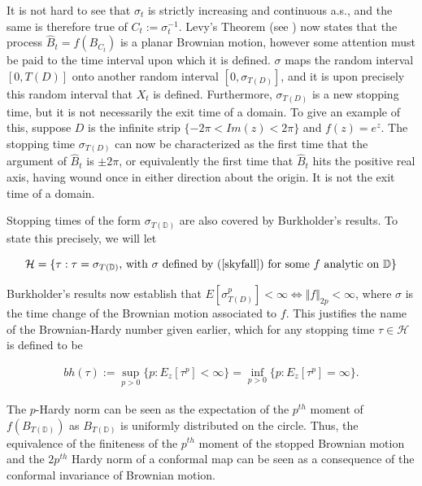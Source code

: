 \documentclass[a4paper, oneside, 12pt]{amsart}
\newcommand{\DD}{\mathbb{D}}
\newcommand{\HHH}{\mathcal{H}}
\begin{document}
It is not hard to see that $\sigma_t$ is strictly increasing and continuous a.s., and the same is therefore true of $C_t := \sigma_t^{-1}$. Levy's Theorem (see \cite{bass, davis, durBM}) now states that the process $\hat B_t = f(B_{C_t})$ is a planar Brownian motion, however some attention must be paid to the time interval upon which it is defined. $\sigma$ maps the random interval $[0,T(D)]$ onto another random interval $[0,\sigma_{T(D)}]$, and it is upon precisely this random interval that $X_t$ is defined. Furthermore, $\sigma_{T(D)}$ is a new stopping time, but it is not necessarily the exit time of a domain. To give an example of this, suppose $D$ is the infinite strip $\{-2\pi < Im(z) < 2\pi\}$ and $f(z) = e^z$. The stopping time $\sigma_{T(D)}$ can now be characterized as the first time that the argument of $\hat B_t$ is $\pm 2\pi$, or equivalently the first time that $\hat B_t$ hits the positive real axis, having wound once in either direction about the origin. It is not the exit time of a domain.

Stopping times of the form $\sigma_{T(\DD)}$ are also covered by Burkholder's results. To state this precisely, we will let 

$$
\HHH = \{\tau: \tau = \sigma_{T(\DD)} \text{, with $\sigma$ defined by (\ref{skyfall}) for some $f$ analytic on $\DD$}\}
$$


Burkholder's results now establish that $E[\sigma_{T(D)}^{p}] < \infty \Longleftrightarrow \Vert f\Vert_{2p} < \infty$, where $\sigma$ is the time change of the Brownian motion associated to $f$.
This justifies the name of the Brownian-Hardy number given earlier, which for any stopping time $\tau \in \HHH$ is defined to be 

\begin{align*}
        bh(\tau) := \sup_{p>0}\{p: E_z [\tau^p] < \infty\} = \inf_{p>0}\{p: E_z [\tau^p] = \infty\}.
\end{align*}

The $p$-Hardy norm can be seen as the expectation of the $p^{th}$
moment of $f(B_{T(\mathbb{D})})$ as $B_{T(\mathbb{D})}$ is uniformly
distributed on the circle. Thus, the equivalence of the finiteness
of the $p^{th}$ moment of the stopped Brownian motion and the $2p^{th}$
Hardy norm of a conformal map can be seen as a consequence of the
conformal invariance of Brownian motion. 
\fi
\end{document}
